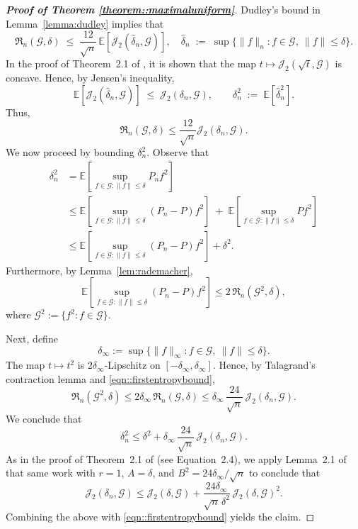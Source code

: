 \documentclass[11pt]{article}
\theoremstyle{plain}
\theoremstyle{definition} %
\begin{document}
\begin{proof}[\textbf{Proof of Theorem \ref{theorem::maximaluniform}}]
Dudley's bound in Lemma~\ref{lemma:dudley} implies that
\[
\mathfrak{R}_n(\mathcal{G},\delta)
\;\le\;
\frac{12}{\sqrt{n}}\, \mathbb{E}\left[\mathcal{J}_2(\hat{\delta}_n,\mathcal{G})\right], \quad \hat{\delta}_n
\;:=\;
\sup\bigl\{\|f\|_n : f\in\mathcal G,\ \|f\|\le \delta\bigr\}.
\]
In the proof of Theorem~2.1 of \cite{van2011local}, it is shown that the map $t \mapsto \mathcal{J}_2(\sqrt{t},\mathcal{G})$ is concave. Hence, by Jensen's inequality,
\[
\mathbb{E}\left[\mathcal{J}_2(\hat{\delta}_n,\mathcal{G})\right]
\;\le\;
\mathcal{J}_2(\delta_n,\mathcal{G}),
\qquad
\delta_n^2 \;:=\; \mathbb{E}\left[\hat{\delta}_n^2\right].
\]
Thus,
\begin{equation}
\label{eqn::firstentropybound}
\mathfrak{R}_n(\mathcal{G},\delta) \le \frac{12}{\sqrt{n}}  \mathcal{J}_2(\delta_n,\mathcal{G}).
\end{equation}
We now proceed by bounding $\delta_n^2$. Observe that
\begin{align*}
\delta_n^2
&= \mathbb{E}\left[ \sup_{f \in \mathcal{G}: \|f\|\le \delta} P_n f^2 \right] \\
&\le \mathbb{E}\left[ \sup_{f \in \mathcal{G}: \|f\|\le \delta} (P_n - P) f^2 \right]
\;+\;
\mathbb{E}\left[ \sup_{f \in \mathcal{G}: \|f\|\le \delta} P f^2 \right] \\
&\le \mathbb{E}\left[ \sup_{f \in \mathcal{G}: \|f\|\le \delta} (P_n - P) f^2 \right] + \delta^2.
\end{align*}
Furthermore, by Lemma~\ref{lem:rademacher},
\[
\mathbb{E}\left[ \sup_{f \in \mathcal{G}: \|f\|\le \delta} (P_n - P) f^2 \right]
\le 2\,\mathfrak{R}_n(\mathcal{G}^2,\delta),
\]
where $\mathcal{G}^2 := \{f^2 : f \in \mathcal{G}\}$.

Next, define
\[
\delta_{\infty}
:= \sup\bigl\{\|f\|_{\infty} : f \in \mathcal{G},\ \|f\|\le \delta\bigr\}.
\]
The map $t \mapsto t^2$ is $2\delta_{\infty}$-Lipschitz on $[-\delta_{\infty},\delta_{\infty}]$. Hence, by Talagrand's contraction lemma and \eqref{eqn::firstentropybound},
\[
\mathfrak{R}_n(\mathcal{G}^2,\delta)
\le 2\delta_{\infty}\,\mathfrak{R}_n(\mathcal{G},\delta)
\le \delta_{\infty}\,\frac{24}{\sqrt{n}}\,\mathcal{J}_2(\delta_n,\mathcal{G}).
\]
We conclude that
\[
\delta_n^2 \le \delta^2 + \delta_{\infty}\,\frac{24}{\sqrt{n}}\,\mathcal{J}_2(\delta_n,\mathcal{G}).
\]
As in the proof of Theorem~2.1 of \cite{van2011local} (see Equation~2.4), we apply Lemma~2.1 of that same work with $r=1$, $A=\delta$, and $B^2 = 24\delta_{\infty}/\sqrt{n}$ to conclude that
\begin{equation}
\mathcal{J}_2(\delta_n,\mathcal{G})
\le
\mathcal{J}_2(\delta,\mathcal{G})
+
\frac{24\delta_{\infty}}{\sqrt{n}\,\delta^2}\,\mathcal{J}_2(\delta,\mathcal{G})^2.
\end{equation}
Combining the above with \eqref{eqn::firstentropybound} yields the claim.



\end{proof}
\end{document}
